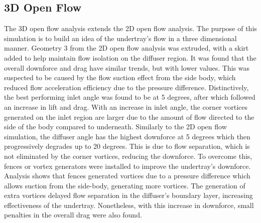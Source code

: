 \subsection{3D Open Flow}
The 3D open flow analysis extends the 2D open flow analysis. The purpose of this simulation is to build an idea of the undertray's flow in a three dimensional manner. Geometry 3 from the 2D open flow analysis was extruded, with a skirt added to help maintain flow isolation on the diffuser region. It was found that the overall downforce and drag have similar trends, but with lower values. This was suspected to be caused by the flow suction effect from the side body, which reduced flow acceleration efficiency due to the pressure difference. Distinctively, the best performing inlet angle was found to be at 5 degrees, after which followed an increase in lift and drag. With an increase in inlet angle, the corner vortices generated on the inlet region are larger due to the amount of flow directed to the side of the body compared to underneath. Similarly to the 2D open flow simulation, the diffuser angle has the highest downforce at 5 degrees which then progressively degrades up to 20 degrees. This is due to flow separation, which is not eliminated by the corner vortices, reducing the downforce. To overcome this, fences or vortex generators were installed to improve the undertray's downforce. Analysis shows that fences generated vortices due to a pressure difference which allows suction from the side-body, generating more vortices. The generation of extra vortices delayed flow separation in the diffuser's boundary layer, increasing effectiveness of the undertray. Nonetheless, with this increase in downforce, small penalties in the overall drag were also found.


